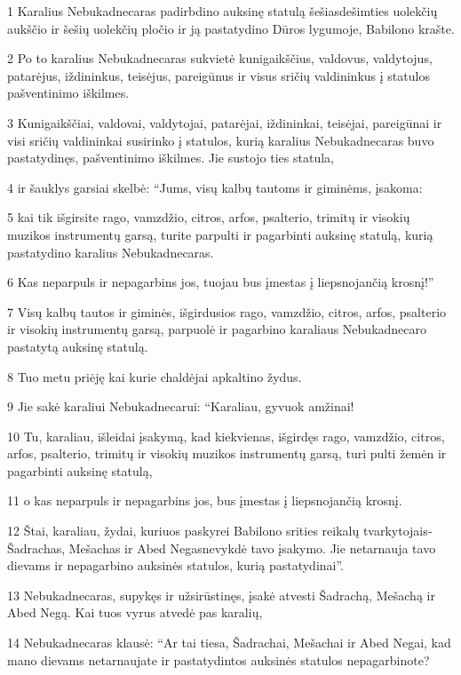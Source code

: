 \par 1 Karalius Nebukadnecaras padirbdino auksinę statulą šešiasdešimties uolekčių aukščio ir šešių uolekčių pločio ir ją pastatydino Dūros lygumoje, Babilono krašte. 
\par 2 Po to karalius Nebukadnecaras sukvietė kunigaikščius, valdovus, valdytojus, patarėjus, iždininkus, teisėjus, pareigūnus ir visus sričių valdininkus į statulos pašventinimo iškilmes. 
\par 3 Kunigaikščiai, valdovai, valdytojai, patarėjai, iždininkai, teisėjai, pareigūnai ir visi sričių valdininkai susirinko į statulos, kurią karalius Nebukadnecaras buvo pastatydinęs, pašventinimo iškilmes. Jie sustojo ties statula, 
\par 4 ir šauklys garsiai skelbė: “Jums, visų kalbų tautoms ir giminėms, įsakoma: 
\par 5 kai tik išgirsite rago, vamzdžio, citros, arfos, psalterio, trimitų ir visokių muzikos instrumentų garsą, turite parpulti ir pagarbinti auksinę statulą, kurią pastatydino karalius Nebukadnecaras. 
\par 6 Kas neparpuls ir nepagarbins jos, tuojau bus įmestas į liepsnojančią krosnį!” 
\par 7 Visų kalbų tautos ir giminės, išgirdusios rago, vamzdžio, citros, arfos, psalterio ir visokių instrumentų garsą, parpuolė ir pagarbino karaliaus Nebukadnecaro pastatytą auksinę statulą. 
\par 8 Tuo metu priėję kai kurie chaldėjai apkaltino žydus. 
\par 9 Jie sakė karaliui Nebukadnecarui: “Karaliau, gyvuok amžinai! 
\par 10 Tu, karaliau, išleidai įsakymą, kad kiekvienas, išgirdęs rago, vamzdžio, citros, arfos, psalterio, trimitų ir visokių muzikos instrumentų garsą, turi pulti žemėn ir pagarbinti auksinę statulą, 
\par 11 o kas neparpuls ir nepagarbins jos, bus įmestas į liepsnojančią krosnį. 
\par 12 Štai, karaliau, žydai, kuriuos paskyrei Babilono srities reikalų tvarkytojais­Šadrachas, Mešachas ir Abed Negas­nevykdė tavo įsakymo. Jie netarnauja tavo dievams ir nepagarbino auksinės statulos, kurią pastatydinai”. 
\par 13 Nebukadnecaras, supykęs ir užsirūstinęs, įsakė atvesti Šadrachą, Mešachą ir Abed Negą. Kai tuos vyrus atvedė pas karalių, 
\par 14 Nebukadnecaras klausė: “Ar tai tiesa, Šadrachai, Mešachai ir Abed Negai, kad mano dievams netarnaujate ir pastatydintos auksinės statulos nepagarbinote? 
